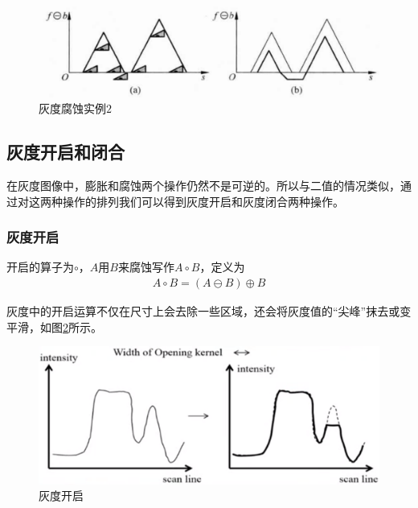 \documentclass[UTF8]{ctexart}
\begin{document}
                			\begin{figure}[H]
                				\centering 
                				\includegraphics[scale=0.35]{grey_erosion2.png} 
                				\caption{灰度腐蚀实例$2$} 
                				\label{grey_erosion2}
                			\end{figure}     
                            
        \subsection{灰度开启和闭合}
        
            \indent 在灰度图像中，膨胀和腐蚀两个操作仍然不是可逆的。所以与二值的情况类似，通过对这两种操作的排列我们可以得到灰度开启和灰度闭合两种操作。       
            
                \subsubsection{灰度开启}
                
                    \indent 开启的算子为$\circ$，$A$用$B$来腐蚀写作$A \circ B$，定义为
                        \begin{align}
                            A \circ B = \left( A \ominus B \right) \oplus B
                        \end{align}                
                
                    \indent 灰度中的开启运算不仅在尺寸上会去除一些区域，还会将灰度值的“尖峰”抹去或变平滑，如图\ref{grey_opening}所示。

                			\begin{figure}[H]
                				\centering 
                				\includegraphics[scale=0.3]{grey_opening.png} 
                				\caption{灰度开启} 
                				\label{grey_opening}
                			\end{figure}
                            
\end{document}

